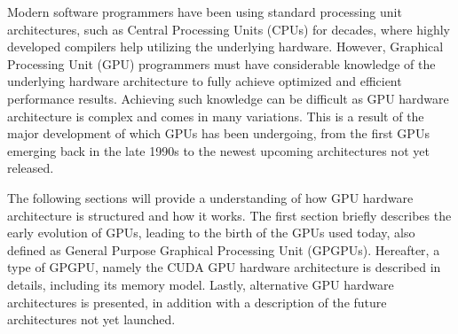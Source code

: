 Modern software programmers have been using standard processing unit architectures, such as Central Processing Units (CPUs) for decades, where highly developed compilers help utilizing the underlying hardware.
However, Graphical Processing Unit (GPU) programmers must have considerable knowledge of the underlying hardware architecture to fully achieve optimized and efficient performance results.
Achieving such knowledge can be difficult as GPU hardware architecture is complex and comes in many variations.
This is a result of the major development of which GPUs has been undergoing, from the first GPUs emerging back in the late 1990s to the newest upcoming architectures not yet released.

The following sections will provide a understanding of how GPU hardware architecture is structured and how it works.
The first section briefly describes the early evolution of GPUs, leading to the birth of the GPUs used today, also defined as General Purpose Graphical Processing Unit (GPGPUs).
Hereafter, a type of GPGPU, namely the CUDA GPU hardware architecture is described in details, including its memory model.
Lastly, alternative GPU hardware architectures is presented, in addition with a description of 
the future architectures not yet launched.



 